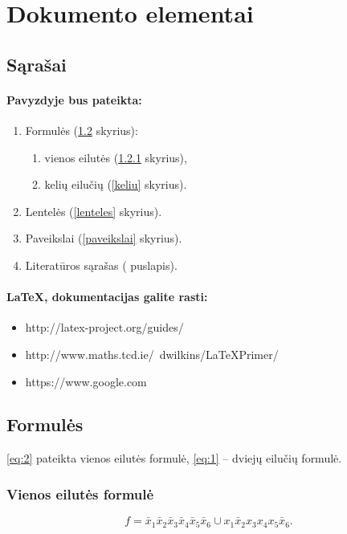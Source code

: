\documentclass[a4paper,12pt]{article}
\begin{document}
% 		

\tableofcontents

\newpage


\section{Dokumento elementai}

\subsection{Sąrašai}

\paragraph{Pavyzdyje bus pateikta:}	
\begin{enumerate}
	\item Formulės (\ref{formules} skyrius):
	\begin{enumerate}
		\item vienos eilutės (\ref{vienos} skyrius),
		\item kelių eilučių  (\ref{keliu} skyrius).
	\end{enumerate}
	\item Lentelės (\ref{lenteles} skyrius).
	\item Paveikslai (\ref{paveikslai} skyrius).
	\item Literatūros sąrašas (\pageref{literatura} puslapis).
\end{enumerate}

\paragraph{LaTeX, dokumentacijas galite rasti:}
\begin{itemize}
	\item http://latex-project.org/guides/
	\item http://www.maths.tcd.ie/~dwilkins/LaTeXPrimer/
	\item https://www.google.com
\end{itemize}

\subsection{Formulės} \label{formules}
\eqref{eq:2} pateikta vienos eilutės formulė, \eqref{eq:1} -- dviejų eilučių formulė.

\subsubsection{Vienos eilutės formulė} \label{vienos}
\begin{equation}
	f = \bar{x}_{1}\bar{x}_{2}\bar{x}_{3}\bar{x}_{4}\bar{x}_{5}\bar{x}_{6}\cup x_{1}\bar{x}_{2} x_{3} x_{4} x_{5}\bar{x}_{6}. \label{eq:2}
\end{equation}
\end{document}
